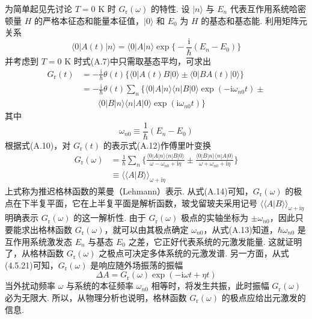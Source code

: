 为简单起见先讨论 $T=0$ K 时 $G_{\mathrm{r}}(\omega)$ 的特性. 设 $|n\rangle$ 与 $E_{n}$ 代表互作用系统哈密顿量 $H$ 的严格本征态和能量本征值，$|0\rangle$ 和 $E_{0}$ 为 $H$ 的基态和基态能. 利用矩阵元关系
\begin{equation}
\langle0|A(t)|n\rangle=\langle0|A|n\rangle
\exp\biggl\{-\frac{\mathrm{i}}{\hbar}(E_{n}-E_{0})\biggr\}
\end{equation}
并考虑到 $T=0$ K 时式(A.7)中只需取基态平均，可求出
\begin{equation}
\begin{aligned}
G_{\mathrm{r}}(t)&=-\frac{\mathrm{i}}{\hbar}\theta(t)
\bigl\{\langle0|A(t)B|0\rangle\pm\langle0|BA(t)|0\rangle\bigr\}\\
&=-\frac{\mathrm{i}}{\hbar}\theta(t)\sum_{n}\bigl\{
\langle0|A|n\rangle\langle n|B|0\rangle
\exp(-\mathrm{i}\omega_{n0}t)\pm\\
&\qquad\langle0|B|n\rangle\langle n|A|0\rangle
\exp(\mathrm{i}\omega_{n0}t)\bigr\}
\end{aligned}
\end{equation}
其中
\begin{equation}
\omega_{n0}\equiv\frac{1}{\hbar}(E_{n}-E_{0})
\end{equation}
根据式(A.10)，对 $G_{\mathrm{r}}(t)$ 的表示式(A.12)作傅里叶变换
\begin{equation}
\begin{aligned}
G_{\mathrm{r}}(\omega)&=\frac{1}{\hbar}\sum_{n}\biggl\{
\frac{\langle0|A|n\rangle\langle n|B|0\rangle}
{\omega-\omega_{n0}+\mathrm{i}\eta}
\pm\frac{\langle0|B|n\rangle\langle n|A|0\rangle}
{\omega+\omega_{n0}+\mathrm{i}\eta}\biggr\}\\
&\equiv\langle\langle A|B\rangle\rangle_{\omega+\mathrm{i}\eta}
\end{aligned}
\end{equation}
上式称为推迟格林函数的莱曼（Lehmann）表示. 从式(A.14)可知，$G_{\mathrm{r}}(\omega)$ 的极点在下半复平面，它在上半复平面是解析函数，玻戈留玻夫采用记号 $\langle\langle A|B\rangle\rangle_{\omega+\mathrm{i}\eta}$ 明确表示 $G_{\mathrm{r}}(\omega)$ 的这一解析性. 由于 $G_{\mathrm{r}}(\omega)$ 极点的实轴坐标为 $\pm\omega_{n0}$，因此只要能求出格林函数 $G_{\mathrm{r}}(\omega)$，就可以由其极点确定 $\omega_{n0}$，从式(A.13)知道，$\hbar\omega_{n0}$ 是互作用系统激发态 $E_{n}$ 与基态 $E_{0}$ 之差，它正好代表系统的元激发能量. 这就证明了，从格林函数 $G_{\mathrm{r}}(\omega)$ 之极点可决定多体系统的元激发谱. 另一方面，从式(4.5.21)可知，$G_{\mathrm{r}}(\omega)$ 是响应随外场振荡的振幅
\begin{equation*}
\Delta A=G_{\mathrm{r}}(\omega)\exp(-\mathrm{i}\omega t+\eta t)
\end{equation*}
当外扰动频率 $\omega$ 与系统的本征频率 $\omega_{n0}$ 相等时，将发生共振，此时振幅 $G_{\mathrm{r}}(\omega)$ 必为无限大. 所以，从物理分析也说明，格林函数 $G_{\mathrm{r}}(\omega)$ 的极点应给出元激发的信息.

